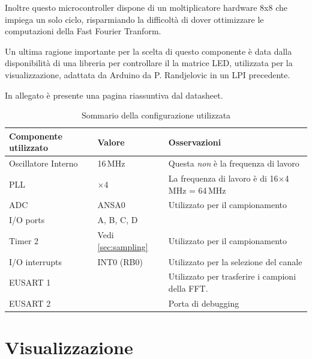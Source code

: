 Inoltre questo microcontroller dispone di un moltiplicatore hardware 8x8 che
impiega un solo ciclo, risparmiando la difficolt\`a di dover ottimizzare le
computazioni della Fast Fourier Tranform.

Un ultima ragione importante per la scelta di questo componente \`e data dalla
disponibilit\`a di una libreria per controllare il la matrice LED, utilizzata
per la visualizzazione, adattata da Arduino da P. Randjelovic in un LPI
precedente.

In allegato \`e presente una pagina riassuntiva dal datasheet.

\begin{table}[H] \centering
    \caption{Sommario della configurazione utilizzata}
    \begin{tabularx}{\textwidth}{l l X}
        \toprule
        \bfseries Componente utilizzato & \bfseries Valore & \bfseries Osservazioni \\
        \midrule
        Oscillatore Interno & 16\,MHz & 
            Questa \emph{non} \`e la frequenza di lavoro \\
        PLL & \(\times\)4 & 
            La frequenza di lavoro \`e di 16\(\times\)4\,MHz = 64\,MHz \\
        ADC & \ttfamily ANSA0 &
            Utilizzato per il campionamento \\
        I/O ports & \ttfamily A, B, C, D & \\
        Timer 2 & Vedi \ref{sec:sampling} & Utilizzato per il campionamento \\
        I/O interrupts & \ttfamily INT0 (RB0) &
            Utilizzato per la selezione del canale \\
        EUSART 1 & & 
            Utilizzato per trasferire i campioni della FFT. \\
        EUSART 2 & &
            Porta di debugging \\
        \bottomrule
    \end{tabularx}
\end{table}

 \section{Visualizzazione}
